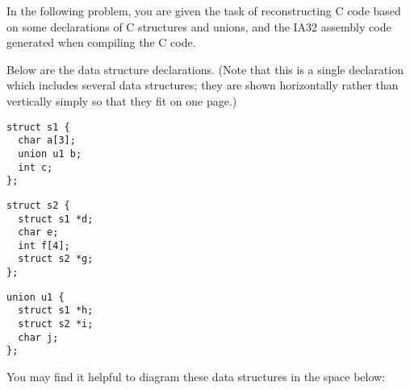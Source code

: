 In the following problem, you are given the task of reconstructing C
code based on some declarations of C structures and unions, and the
IA32 assembly code generated when compiling the C code.

Below are the data
structure declarations.  (Note that this is a single
declaration which includes several data structures; they are shown
horizontally rather than vertically simply so that they fit on one page.)

\begin{minipage}[t]{2.0in}
\begin{verbatim}
struct s1 {
  char a[3];
  union u1 b;
  int c;
};
\end{verbatim}
\end{minipage}
\begin{minipage}[t]{2.0in}
\begin{verbatim}
struct s2 {
  struct s1 *d;
  char e;
  int f[4];
  struct s2 *g;
};
\end{verbatim}
\end{minipage}
\begin{minipage}[t]{2.0in}
\begin{verbatim}
union u1 {
  struct s1 *h;
  struct s2 *i;
  char j;
};
\end{verbatim}
\end{minipage}

You may find it helpful to diagram these data structures in the space below:

